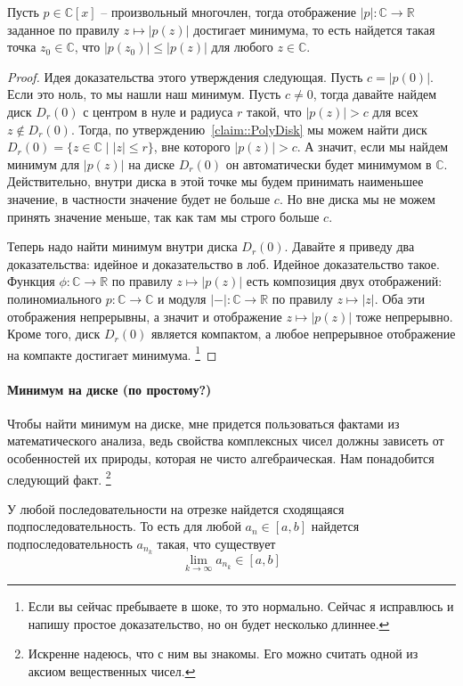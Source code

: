 \begin{claim}
\label{claim::PolyMin}
Пусть $p\in \mathbb C[x]$ -- произвольный многочлен, тогда отображение $|p|\colon \mathbb C\to \mathbb R$ заданное по правилу $z\mapsto |p(z)|$ достигает минимума, то есть найдется такая точка $z_0\in\mathbb C$, что $|p(z_0)|\leqslant |p(z)|$ для любого $z\in \mathbb C$.
\end{claim}
\begin{proof}
Идея доказательства этого утверждения следующая.
Пусть $c = |p(0)|$.
Если это ноль, то мы нашли наш минимум.
Пусть $c\neq 0$, тогда давайте найдем диск $D_r(0)$ с центром в нуле и радиуса $r$ такой, что $|p(z)| > c$ для всех $z\notin D_r(0)$.
Тогда, по утверждению~\ref{claim::PolyDisk} мы можем найти диск $D_r(0)= \{z\in\mathbb C\mid |z|\leqslant r\}$, вне которого $|p(z)|>c$.
А значит, если мы найдем минимум для $|p(z)|$ на диске $D_r(0)$ он автоматически будет минимумом в $\mathbb C$.
Действительно, внутри диска в этой точке мы будем принимать наименьшее значение, в частности значение будет не больше $c$.
Но вне диска мы не можем принять значение меньше, так как там мы строго больше $c$.

Теперь надо найти минимум внутри диска $D_r(0)$.
Давайте я приведу два доказательства: идейное и доказательство в лоб.
Идейное доказательство такое.
Функция $\phi\colon \mathbb C\to \mathbb R$ по правилу $z\mapsto |p(z)|$ есть композиция двух отображений: полиномиального $p\colon \mathbb C\to \mathbb C$ и модуля $|{-}|\colon \mathbb C\to\mathbb R$ по правилу $z\mapsto |z|$.
Оба эти отображения непрерывны, а значит и отображение $z\mapsto |p(z)|$ тоже непрерывно.
Кроме того, диск $D_r(0)$ является компактом, а любое непрерывное отображение на компакте достигает минимума.%
\footnote{Если вы сейчас пребываете в шоке, то это нормально.
Сейчас я исправлюсь и напишу простое доказательство, но он будет несколько длиннее.}
\end{proof}

\paragraph{Минимум на диске (по простому?)}

Чтобы найти минимум на диске, мне придется пользоваться фактами из математического анализа, ведь свойства комплексных чисел должны зависеть от особенностей их природы, которая не чисто алгебраическая.
Нам понадобится следующий факт.%
\footnote{Искренне надеюсь, что с ним вы знакомы.
Его можно считать одной из аксиом вещественных чисел.}
\begin{claim*}
[БД]
У любой последовательности на отрезке найдется сходящаяся подпоследовательность.
То есть для любой $a_n\in [a, b]$ найдется подпоследовательность $a_{n_k}$ такая, что существует
\[
\lim_{k\to \infty}a_{n_k}\in [a, b]
\]
\end{claim*}


